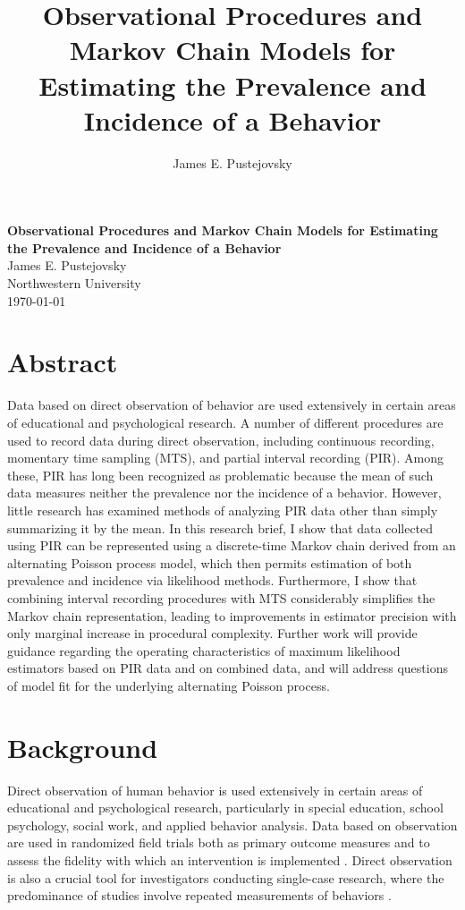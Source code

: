 \documentclass[11pt]{article}
\title{\Large\textbf{Observational Procedures and Markov Chain Models for Estimating the Prevalence and Incidence of a Behavior}}
\author{\normalsize{James E. Pustejovsky}}
\begin{document}
\begin{center}
\Large
\textbf{Observational Procedures and Markov Chain Models for Estimating the Prevalence and Incidence of a Behavior} \\
\vspace{5mm}\normalsize
James E. Pustejovsky \\
Northwestern University \\
\today
\end{center}

\section*{Abstract}

Data based on direct observation of behavior are used extensively in certain areas of educational and psychological research. A number of different procedures are used to record data during direct observation, including continuous recording, momentary time sampling (MTS), and partial interval recording (PIR). Among these, PIR has long been recognized as problematic because the mean of such data measures neither the prevalence nor the incidence of a behavior. However, little research has examined methods of analyzing PIR data other than simply summarizing it by the mean. In this research brief, I show that data collected using PIR can be represented using a discrete-time Markov chain derived from an alternating Poisson process model, which then permits estimation of both prevalence and incidence via likelihood methods. Furthermore, I show that combining interval recording procedures with MTS considerably simplifies the Markov chain representation, leading to improvements in estimator precision with only marginal increase in procedural complexity. Further work will provide guidance regarding the operating characteristics of maximum likelihood estimators based on PIR data and on combined data, and will address questions of model fit for the underlying alternating Poisson process.

\section{Background}

Direct observation of human behavior is used extensively in certain areas of educational and psychological research, particularly in special education, school psychology, social work, and applied behavior analysis. Data based on observation are used in randomized field trials both as primary outcome measures \citep[e.g.,][]{Mahar2006} and to assess the fidelity with which an intervention is implemented \citep[e.g.,][]{Landa2011}. Direct observation is also a crucial tool for investigators conducting single-case research, where the predominance of studies involve repeated measurements of behaviors \citep{Hartmann1990observational, Horner2005use}.
\end{document}
